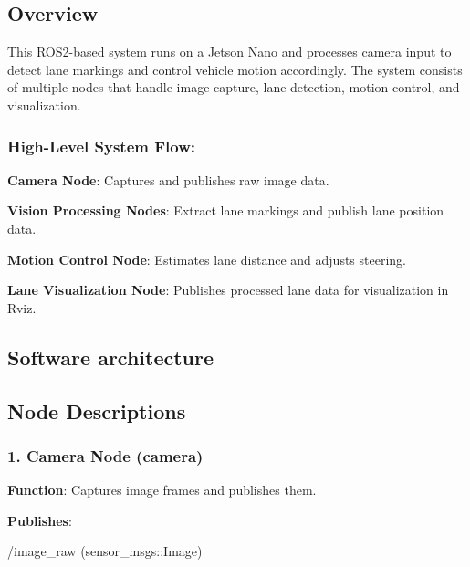 \subsection*{Overview}

This R\+O\+S2-\/based system runs on a Jetson Nano and processes camera input to detect lane markings and control vehicle motion accordingly. The system consists of multiple nodes that handle image capture, lane detection, motion control, and visualization.

\subsubsection*{High-\/\+Level System Flow\+:}


\begin{DoxyEnumerate}
\item {\bfseries Camera Node}\+: Captures and publishes raw image data.
\item {\bfseries Vision Processing Nodes}\+: Extract lane markings and publish lane position data.
\item {\bfseries Motion Control Node}\+: Estimates lane distance and adjusts steering.
\item {\bfseries Lane Visualization Node}\+: Publishes processed lane data for visualization in Rviz.
\end{DoxyEnumerate}

\subsection*{Software architecture}



\subsection*{Node Descriptions}

\subsubsection*{1. Camera Node ({\ttfamily camera})}

{\bfseries Function}\+: Captures image frames and publishes them.
\begin{DoxyItemize}
\item {\bfseries Publishes}\+:
\begin{DoxyItemize}
\item {\ttfamily /image\+\_\+raw} (sensor\+\_\+msgs\+::\+Image)
\end{DoxyItemize}
\end{DoxyItemize}

